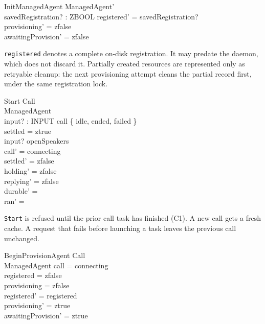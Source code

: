 \documentclass[a4paper,10pt,fleqn]{article}
\begin{document}
\begin{schema}{InitManagedAgent}
  ManagedAgent' \\
  savedRegistration? : ZBOOL
\where
  registered' = savedRegistration? \\
  provisioning' = zfalse \\
  awaitingProvision' = zfalse
\end{schema}

\texttt{registered} denotes a complete on-disk registration. It may
predate the daemon, which does not discard it. Partially created resources
are represented only as retryable cleanup: the next provisioning attempt
cleans the partial record first, under the same registration lock.

\begin{schema}{Start}
  \Delta Call \\
  \Xi ManagedAgent \\
  input? : INPUT
\where
  call \in \{ idle, ended, failed \} \\
  settled = ztrue \\
  input? \neq openSpeakers \\
  call' = connecting \\
  settled' = zfalse \\
  holding' = zfalse \\
  replying' = zfalse \\
  durable' = \emptyset \\
  ran' = \emptyset
\end{schema}

\texttt{Start} is refused until the prior call task has finished (C1).
A new call gets a fresh cache. A request that fails before launching a
task leaves the previous call unchanged.

\begin{schema}{BeginProvisionAgent}
  \Xi Call \\
  \Delta ManagedAgent
\where
  call = connecting \\
  registered = zfalse \\
  provisioning = zfalse \\
  registered' = registered \\
  provisioning' = ztrue \\
  awaitingProvision' = ztrue
\end{schema}
\end{document}
